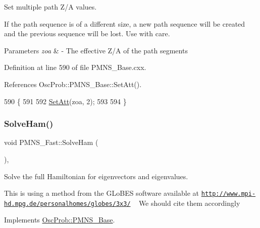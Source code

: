Set multiple path Z/A values.

If the path sequence is of a different size, a new path sequence will be created and the previous sequence will be lost. Use with care.


\begin{DoxyParams}{Parameters}
{\em zoa} & -\/ The effective Z/A of the path segments \\
\hline
\end{DoxyParams}


Definition at line 590 of file P\+M\+N\+S\+\_\+\+Base.\+cxx.



References Osc\+Prob\+::\+P\+M\+N\+S\+\_\+\+Base\+::\+Set\+Att().


\begin{DoxyCode}
590                                            \{
591 
592   \hyperlink{classOscProb_1_1PMNS__Base_aba565962a440d14bee7a2a96d2eca2c5}{SetAtt}(zoa, 2);
593 
594 \}
\end{DoxyCode}
\mbox{\label{classOscProb_1_1PMNS__Fast_a8a0828401591e88c60e0051fbfe02d5e}} 
\subsubsection{\texorpdfstring{Solve\+Ham()}{SolveHam()}}
{\footnotesize\ttfamily void P\+M\+N\+S\+\_\+\+Fast\+::\+Solve\+Ham (\begin{DoxyParamCaption}{ }\end{DoxyParamCaption})\hspace{0.3cm}{\ttfamily [protected]}, {\ttfamily [virtual]}}

Solve the full Hamiltonian for eigenvectors and eigenvalues.

This is using a method from the G\+Lo\+B\+ES software available at \href{http://www.mpi-hd.mpg.de/personalhomes/globes/3x3/}{\tt http\+://www.\+mpi-\/hd.\+mpg.\+de/personalhomes/globes/3x3/} ~\newline
We should cite them accordingly 

Implements \hyperlink{classOscProb_1_1PMNS__Base_a91f065cb9e910e0095e41462b4420b01}{Osc\+Prob\+::\+P\+M\+N\+S\+\_\+\+Base}.



